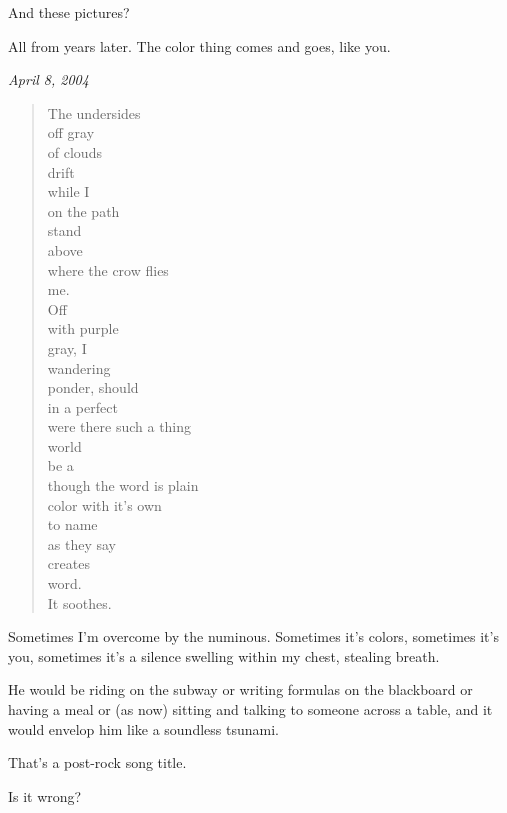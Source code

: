 \begin{paracol}{2}
\begin{leftcolumn}
\begin{ally}
And these pictures?
\end{ally}
All from years later. The color thing comes and goes, like you.
\end{leftcolumn}
\begin{rightcolumn*}
\emph{April 8, 2004}
\end{rightcolumn*}
\begin{leftcolumn}
\begin{verse}
The undersides\\
\vin \vin off gray\\
\vin of clouds\\
\vin drift\\
\vin \vin while I\\
\vin \vin \vin on the path\\
\vin \vin stand\\
\vin above\\
\vin \vin where the crow flies\\
\vin me.\\
Off\\
\vin \vin with purple\\
\vin gray, I\\
\vin \vin wandering\\
\vin ponder, should\\
\vin \vin in a perfect\\
\vin \vin \vin were there such a thing\\
\vin \vin world\\
\vin be a\\
\vin \vin though the word is plain\\
\vin color with it's own\\
\vin \vin to name\\
\vin \vin \vin as they say\\
\vin \vin creates\\
\vin word.\\
It soothes.
\end{verse}

\noindent Sometimes I'm overcome by the numinous. Sometimes it's colors, sometimes it's you, sometimes it's a silence swelling within my chest, stealing breath.

\begin{ally}
He would be riding on the subway or writing formulas on the blackboard or having a meal or (as now) sitting and talking to someone across a table, and it would envelop him like a soundless tsunami.
\end{ally}
That's a post-rock song title.

\begin{ally}
Is it wrong?
\end{ally}
\end{leftcolumn}
\end{paracol}

